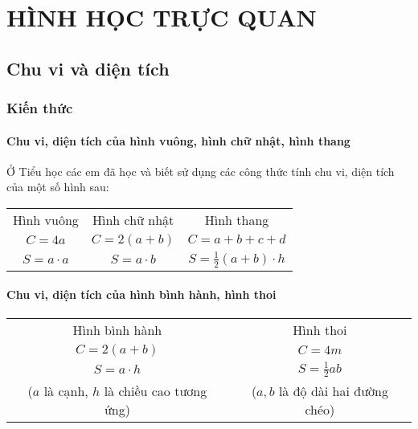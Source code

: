 \def\i{\item}
\graphicspath{{../pictures/vande37/}}
\chapter{HÌNH HỌC TRỰC QUAN}
\section{Chu vi và diện tích}
\subsection{Kiến thức}
\subsubsection{Chu vi, diện tích của hình vuông, hình chữ nhật, hình thang}
Ở Tiểu học các em đã học và biết sử dụng các công thức tính chu vi, diện tích của một số hình sau:
\begin{tabular}{c c c}
	Hình vuông     &          Hình chữ nhật&                      Hình thang\\
	$C=4a$& $C=2(a+b)$ & $C=a+b+c+d$\\
	$S=a\cdot a$& $S=a\cdot b$& $S=\frac{1}{2}(a+b)\cdot h$ 
\end{tabular}
\subsubsection{Chu vi, diện tích của hình bình hành, hình thoi}
\begin{tabular}{c c}
	Hình bình hành             &                       Hình thoi\\
	$C=2(a+b)$& $C=4m$\\
	$S=a\cdot h $ & $S=\frac{1}{2}ab$\\
	($a$ là cạnh, $h$ là chiều cao tương ứng) &($a,b$ là độ dài hai đường chéo)
\end{tabular}
